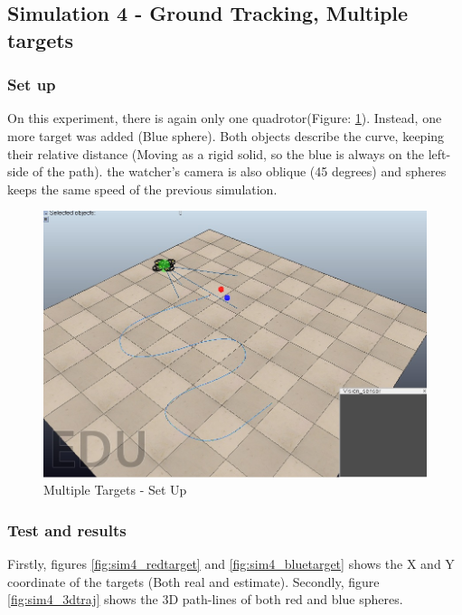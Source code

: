 \subsection{Simulation 4 - Ground Tracking, Multiple targets}
\subsubsection{Set up}
 On this experiment, there is again only one quadrotor(Figure: \ref{fig:sim4_set_up}). Instead, one more target was added (Blue sphere). Both objects describe the curve, keeping their relative distance (Moving as a rigid solid, so the blue is always on the left-side of the path). the watcher's camera is also oblique (45 degrees) and spheres keeps the same speed of the previous simulation.
 
\begin{figure}[ht]
	\centering
	\includegraphics[width=0.7\linewidth]{../Images/c3/sim4_set_up}
	\caption{Multiple Targets - Set Up}
	\label{fig:sim4_set_up}
\end{figure}

\subsubsection{Test and results}

	Firstly, figures \ref{fig:sim4_redtarget} and \ref{fig:sim4_bluetarget} shows the X and Y coordinate of the targets (Both real and estimate). Secondly, figure \ref{fig:sim4_3dtraj} shows the 3D path-lines of both red and blue spheres. \\
	
